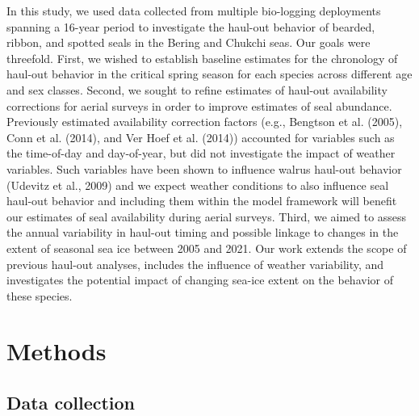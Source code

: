 \documentclass[fleqn,10pt,lineno]{wlpeerj} %
\begin{document}
In this study, we used data collected from multiple bio-logging deployments
spanning a 16-year period to investigate the haul-out
behavior of bearded, ribbon, and spotted seals in the Bering and Chukchi seas.
Our goals were threefold. First, we wished to establish baseline estimates for
the chronology of haul-out behavior in the critical spring season for each
species across different age and sex classes. Second, we sought to refine
estimates of haul-out availability corrections for aerial surveys in order to
improve estimates of seal abundance. Previously estimated availability
correction factors (e.g., Bengtson et al. (2005), Conn et al. (2014), and Ver Hoef et al. (2014))
accounted for variables such as the time-of-day and day-of-year, but did not
investigate the impact of weather variables. Such variables have been
shown to influence walrus haul-out behavior (Udevitz et al., 2009) and we expect weather
conditions to also influence seal haul-out behavior and including them within
the model framework will benefit our estimates of seal availability during
aerial surveys. Third, we aimed to assess the annual variability in haul-out
timing and possible linkage to changes in the extent of seasonal sea ice between
2005 and 2021. Our work extends the scope of previous haul-out analyses,
includes the influence of weather variability, and investigates the
potential impact of changing sea-ice extent on the behavior of these species.

\section*{Methods}\label{methods}

\subsection*{Data collection}\label{data-collection}
\end{document}
